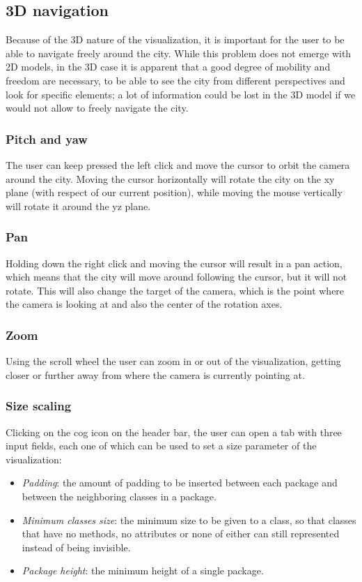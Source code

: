 \documentclass[]{usiinfbachelorproject}
\begin{document}
\subsection{3D navigation} \label{3D navigation}
Because of the 3D nature of the visualization, it is important for the user to be able to navigate freely around the city. While this problem does not emerge with 2D models, in the 3D case it is apparent that a good
degree of mobility and freedom are necessary, to be able to see the city from different perspectives and look for specific elements; a lot of information could be lost in the 3D model if we would not allow to freely navigate the city.


\subsubsection{Pitch and yaw} \label{Pitch and yaw}
The user can keep pressed the left click and move the cursor to orbit the camera around the city. Moving the cursor horizontally will rotate the city on the xy plane (with respect of our current position), while
moving the mouse vertically will rotate it around the yz plane.

\subsubsection{Pan} \label{Pan}
Holding down the right click and moving the cursor will result in a pan action, which means that the city will move around following the cursor, but it will not rotate. This will also change the target of the camera,
 which is the point where the camera is looking at and also the center of the rotation axes.

 \subsubsection{Zoom} \label{Zoom}
Using the scroll wheel the user can zoom in or out of the visualization, getting closer or further away from where the camera is currently pointing at.

\subsubsection{Size scaling} \label{Size scaling}
Clicking on the cog icon on the header bar, the user can open a tab with three input fields, each one of which can be used to set a size parameter of the visualization:

\begin{itemize}
\item \textit{Padding}: the amount of padding to be inserted between each package and between the neighboring classes in a package.
\item \textit{Minimum classes size}: the minimum size to be given to a class, so that classes that have no methods, no attributes or none of either can still represented instead of being invisible.
\item \textit{Package height}: the minimum height of a single package.
\end{itemize}
\end{document}
